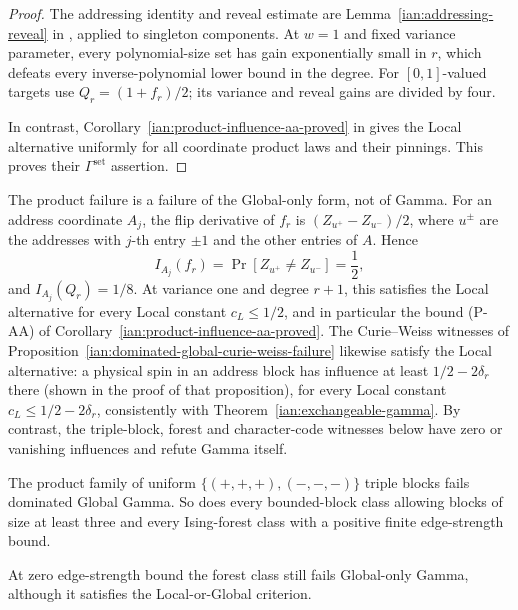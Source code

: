 \begin{proof}
The addressing identity and reveal estimate are
Lemma~\ref{ian:addressing-reveal} in
, applied to singleton
components. At \(w=1\) and fixed variance parameter, every
polynomial-size set has gain exponentially small in \(r\), which
defeats every inverse-polynomial lower bound in the degree.
For \([0,1]\)-valued targets use \(Q_r=(1+f_r)/2\);
its variance and reveal gains are divided by four.

In contrast, Corollary~\ref{ian:product-influence-aa-proved} in
 gives the Local
alternative uniformly for all coordinate product laws and their
pinnings. This proves their \(\Gamma^{\mathrm{set}}\) assertion.
\end{proof}

\begin{remark}
\label{ian:dominated-global-address-influence}
The product failure is a failure of the Global-only form, not of
Gamma. For an address coordinate \(A_j\), the flip derivative of
\(f_r\) is \((Z_{u^+}-Z_{u^-})/2\), where \(u^\pm\) are the addresses
with \(j\)-th entry \(\pm1\) and the other entries of \(A\). Hence
\[
 I_{A_j}(f_r)=\Pr[Z_{u^+}\ne Z_{u^-}]=\frac12,
\]
and \(I_{A_j}(Q_r)=1/8\). At variance one and degree \(r+1\), this
satisfies the Local alternative for every Local constant
\(c_L\le1/2\), and in particular the bound (P-AA) of
Corollary~\ref{ian:product-influence-aa-proved}. The Curie--Weiss
witnesses of Proposition~\ref{ian:dominated-global-curie-weiss-failure}
likewise satisfy the Local alternative: a physical spin in an address
block has influence at least \(1/2-2\delta_r\) there (shown in the proof
of that proposition), for every Local constant \(c_L\le1/2-2\delta_r\),
consistently with Theorem~\ref{ian:exchangeable-gamma}. By
contrast, the triple-block, forest and character-code witnesses below
have zero or vanishing influences and refute Gamma itself.
\end{remark}

\begin{proposition}
\label{ian:dominated-global-block-forest-failure}
The product family of uniform
\(\{(+,+,+),(-,-,-)\}\) triple blocks fails dominated Global Gamma.
So does every bounded-block class allowing blocks of size at least
three and every Ising-forest class with a positive finite
edge-strength bound.

At zero edge-strength bound the forest class still fails
Global-only Gamma, although it satisfies the Local-or-Global
criterion.
\end{proposition}

